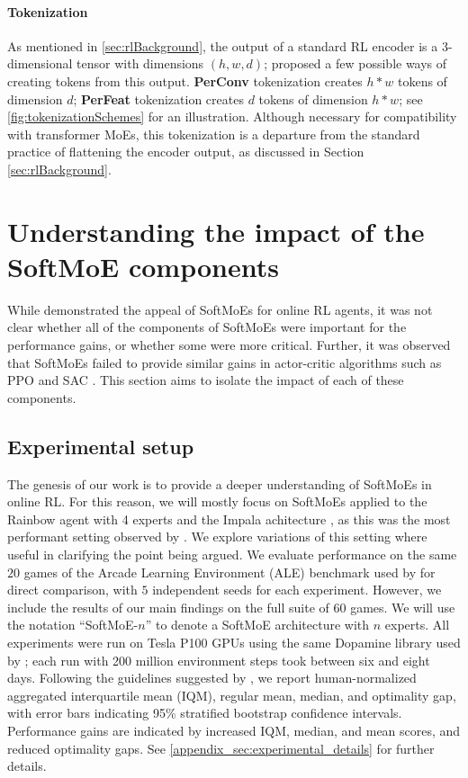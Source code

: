 \documentclass{article} %
\begin{document}
\paragraph{Tokenization} As mentioned in \cref{sec:rlBackground}, the output of a standard RL encoder is a 3-dimensional tensor with dimensions $(h, w, d)$; \citet{ceron2024mixtures} proposed a few possible ways of creating tokens from this output. {\bf PerConv} tokenization creates $h*w$ tokens of dimension $d$; {\bf PerFeat} tokenization creates $d$ tokens of dimension $h*w$;
see \autoref{fig:tokenizationSchemes} for an illustration. Although necessary for compatibility with transformer MoEs, this tokenization is a departure from the standard practice of flattening the encoder output, as discussed in Section \ref{sec:rlBackground}.

\section{Understanding the impact of the SoftMoE components}
\label{sec:understandingSoftMoE}
While \citet{ceron2024mixtures} demonstrated the appeal of SoftMoEs for online RL agents, it was not clear whether all of the components of SoftMoEs were important for the performance gains, or whether some were more critical. Further, it was observed that SoftMoEs failed to provide similar gains in actor-critic algorithms such as PPO \citep{schulman17ppo} and SAC \citep{haarnoja2018soft}. This section aims to isolate the impact of each of these components.

\subsection{Experimental setup}
\label{sec:experimentalSetup}
The genesis of our work is to provide a deeper understanding of SoftMoEs in online RL. For this reason, we will mostly focus on SoftMoEs applied to the Rainbow agent \citep{hessel2018rainbow} with 4 experts and the Impala achitecture \citep{espeholt2018impala}, as this was the most performant setting observed by \citet{ceron2024mixtures}. We explore variations of this setting where useful in clarifying the point being argued. We evaluate performance on the same $20$ games of the Arcade Learning Environment (ALE) \citep{bellemare2013arcade} benchmark used by \citet{ceron2024mixtures} for direct comparison, with $5$ independent seeds for each experiment. However, we include the results of our main findings on the full suite of 60 games.  We will use the notation \enquote{SoftMoE-$n$} to denote a SoftMoE architecture with $n$ experts.
All experiments were run on Tesla P100 GPUs using the same Dopamine 
library \citep{castro18dopamine} used by \citet{ceron2024mixtures}; each run with 200 million environment steps took between six and eight days. Following the guidelines suggested by \citet{agarwal2021deep}, we report human-normalized aggregated interquartile mean (IQM), regular mean, median, and optimality gap, with error bars indicating 95\% stratified bootstrap confidence intervals. Performance gains are indicated by increased IQM, median, and mean scores, and reduced optimality gaps. See \autoref{appendix_sec:experimental_details} for further details.
\end{document}
